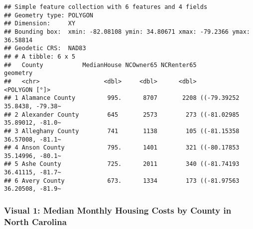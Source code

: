 \documentclass[
]{article}
\newenvironment{Shaded}{\begin{snugshade}}{\end{snugshade}}
\newcommand{\AttributeTok}[1]{\textcolor[rgb]{0.13,0.29,0.53}{#1}}
\newcommand{\ConstantTok}[1]{\textcolor[rgb]{0.56,0.35,0.01}{#1}}
\newcommand{\FloatTok}[1]{\textcolor[rgb]{0.00,0.00,0.81}{#1}}
\newcommand{\FunctionTok}[1]{\textcolor[rgb]{0.13,0.29,0.53}{\textbf{#1}}}
\newcommand{\NormalTok}[1]{#1}
\newcommand{\SpecialCharTok}[1]{\textcolor[rgb]{0.81,0.36,0.00}{\textbf{#1}}}
\newcommand{\StringTok}[1]{\textcolor[rgb]{0.31,0.60,0.02}{#1}}
\begin{document}
\begin{verbatim}
## Simple feature collection with 6 features and 4 fields
## Geometry type: POLYGON
## Dimension:     XY
## Bounding box:  xmin: -82.08108 ymin: 34.80671 xmax: -79.2366 ymax: 36.58814
## Geodetic CRS:  NAD83
## # A tibble: 6 x 5
##   County           MedianHouse NCOwner65 NCRenter65                     geometry
##   <chr>                  <dbl>     <dbl>      <dbl>                <POLYGON [°]>
## 1 Alamance County         995.      8707       2208 ((-79.39252 35.8438, -79.38~
## 2 Alexander County        645       2573        273 ((-81.02985 35.89012, -81.0~
## 3 Alleghany County        741       1138        105 ((-81.15358 36.57008, -81.1~
## 4 Anson County            795.      1401        321 ((-80.17853 35.14996, -80.1~
## 5 Ashe County             725.      2011        340 ((-81.74193 36.41115, -81.7~
## 6 Avery County            673.      1334        173 ((-81.97563 36.20508, -81.9~
\end{verbatim}

\subsubsection{Visual 1: Median Monthly Housing Costs by County in North
Carolina}\label{visual-1-median-monthly-housing-costs-by-county-in-north-carolina}

\begin{Shaded}
\end{Shaded}
\end{document}
